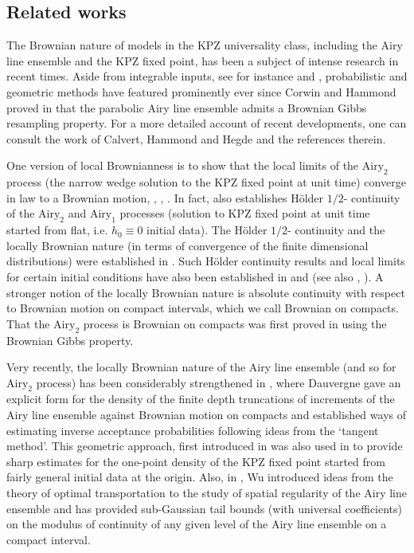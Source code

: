 \documentclass[11pt, reqno]{amsart}
\numberwithin{equation}{section}
\begin{document}
\subsection{Related works}

The Brownian nature of models in the KPZ universality class, including the Airy line ensemble and the KPZ fixed point, has been a subject of intense research in recent times. Aside from integrable inputs, see for instance \cite{baik1999distribution, matetski2016kpz, liu2019multi} and \cite{johansson2019multi, johansson2017two, johansson2018two}, probabilistic and geometric methods have featured prominently ever since Corwin and Hammond proved in \cite{corwin2014brownian} that the parabolic Airy line ensemble admits a Brownian Gibbs resampling property. For a more detailed account of recent developments, one can consult the work of Calvert, Hammond and Hegde \cite{hammond2019patchwork} and the references therein.

One version of local Brownianness is to show that the local limits of the
$\text{Airy}_2$ process (the narrow wedge solution to the KPZ fixed point at unit time) converge in law to a Brownian motion, \cite{hagg2008local}, \cite{cator2015local}, \cite{quastel2013local}. In fact, \cite{quastel2013local} also establishes H\"{o}lder $1/2$-
continuity of the $\text{Airy}_2$ and $\text{Airy}_1$ processes (solution to KPZ fixed point at unit time started from flat, i.e. $h_0\equiv 0$ initial data). The  H\"{o}lder $1/2$- continuity and the locally Brownian nature (in
terms of convergence of the finite dimensional distributions) were established in \cite{matetski2016kpz}. Such H\"{o}lder continuity
results and local limits for certain initial conditions have also been established in \cite{pimentel2018local} and \cite{pimentel2020brownian} (see also \cite{johansson2017two},
\cite{johansson2018two}). A stronger notion of the locally Brownian nature is absolute continuity with respect to Brownian motion
on compact intervals, which we call Brownian on compacts. That the $\text{Airy}_2$ process is Brownian on compacts
was first proved in \cite{corwin2014brownian} using the Brownian Gibbs property.

Very recently, the locally Brownian nature of the Airy line ensemble (and so for $\text{Airy}_2$ process) has been considerably strengthened in \cite{dauvergne2024wienerdensitiesairyline}, where Dauvergne gave an explicit form for the density of the finite depth truncations of increments of the Airy line ensemble against Brownian motion on compacts and established ways of estimating inverse acceptance probabilities following ideas from the `tangent method'. This geometric approach, first introduced in \cite{aggarwal2022arcticboundariesicemodel}  was also used in \cite{ganguly2024sharpuppertailbehavior} to provide sharp estimates for the one-point density of the KPZ fixed point started from fairly general initial data at the origin. Also, in \cite{wu2025applicationsoptimaltransportdyson}, Wu introduced ideas from the theory of optimal transportation to the study of spatial regularity of the Airy line ensemble and has provided sub-Gaussian tail bounds (with universal coefficients) on the modulus of continuity of any given level of the Airy line ensemble on a compact interval.
\end{document}
